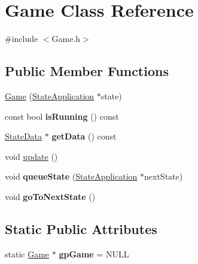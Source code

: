\hypertarget{class_game}{\section{Game Class Reference}
\label{class_game}
}


{\ttfamily \#include $<$Game.\-h$>$}

\subsection*{Public Member Functions}
\begin{DoxyCompactItemize}
\item 
\hyperlink{class_game_a09f1b8c714816ee634939b73fe08622d}{Game} (\hyperlink{class_state_application}{State\-Application} $\ast$state)
\item 
\hypertarget{class_game_aa61c0358c2611d00eb47ebf72a88f8c7}{const bool {\bfseries is\-Running} () const }\label{class_game_aa61c0358c2611d00eb47ebf72a88f8c7}

\item 
\hypertarget{class_game_ac405429a34ce63322174063442040259}{\hyperlink{struct_state_data}{State\-Data} $\ast$ {\bfseries get\-Data} () const }\label{class_game_ac405429a34ce63322174063442040259}

\item 
void \hyperlink{class_game_a79df6376b332d63c9eca0dcee30305c3}{update} ()
\item 
\hypertarget{class_game_afe06acbc24125f9a7e9d94f7740315fb}{void {\bfseries queue\-State} (\hyperlink{class_state_application}{State\-Application} $\ast$next\-State)}\label{class_game_afe06acbc24125f9a7e9d94f7740315fb}

\item 
\hypertarget{class_game_afa29034b42f2825221ffea4fac919363}{void {\bfseries go\-To\-Next\-State} ()}\label{class_game_afa29034b42f2825221ffea4fac919363}

\end{DoxyCompactItemize}
\subsection*{Static Public Attributes}
\begin{DoxyCompactItemize}
\item 
\hypertarget{class_game_a9518d0c89b6d47d2e3042809bc9c5f6a}{static \hyperlink{class_game}{Game} $\ast$ {\bfseries gp\-Game} = N\-U\-L\-L}\label{class_game_a9518d0c89b6d47d2e3042809bc9c5f6a}

\end{DoxyCompactItemize}
